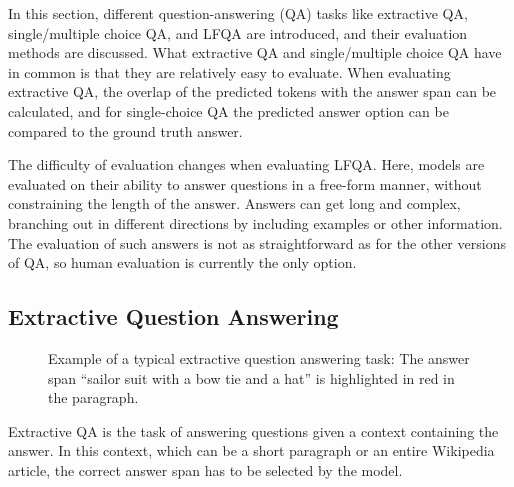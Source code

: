 In this section, different question-answering (QA) tasks like extractive QA, single/multiple choice QA, and LFQA are introduced, and their evaluation methods are discussed.
What extractive QA and single/multiple choice QA have in common is that they are relatively easy to evaluate.
When evaluating extractive QA, the overlap of the predicted tokens with the answer span can be calculated, and for single-choice QA the predicted answer option can be compared to the ground truth answer.

The difficulty of evaluation changes when evaluating LFQA.
Here, models are evaluated on their ability to answer questions in a free-form manner, without constraining the length of the answer.
Answers can get long and complex, branching out in different directions by including examples or other information.
The evaluation of such answers is not as straightforward as for the other versions of QA, so human evaluation is currently the only option.

\subsection{Extractive Question Answering}\label{sec:extractive-qa}
\begin{figure}[tb]
    \centering
    \caption{Example of a typical extractive question answering task: The answer span ``sailor suit with a bow tie and a hat'' is highlighted in red in the paragraph.}\label{fig:extractive_qa_example}
\end{figure}
Extractive QA is the task of answering questions given a context containing the answer.
In this context, which can be a short paragraph or an entire Wikipedia article, the correct answer span has to be selected by the model.

